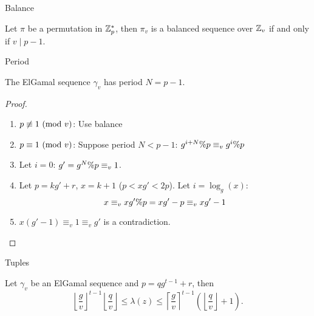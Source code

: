 
\begin{frame}{Balance}

\begin{proposition} \label{balancedproperty}
Let $\pi$ be a permutation in $\mathbb{Z}_p^*$, then $\pi_v$ is a balanced 
sequence over $\mathbb{Z}_v$ if and only if $v \mid p-1$.
\end{proposition}

  
\end{frame}

\begin{frame}{Period}

\begin{theorem}
The ElGamal sequence $\gamma_v$ has period $N = p-1$.
\end{theorem}

\begin{proof}
  \begin{enumerate}
  \item $p \not\equiv 1 \ (\mathrm{mod}\ v)$:  Use balance
  \item $p \equiv 1 \ (\mathrm{mod}\ v)$: Suppose period $N < p-1$: $g^{i+N}\% p \equiv_v g^i \% p$ 
  \item Let $i=0$:  $g' = g^N\% p  \equiv_v 1$.
  \item Let $p = kg'+r$, $x = k+1$ ($p < xg' < 2p$). Let $i = \log_g(x)$:
    \[x \equiv_v xg'\% p = xg'-p \equiv_v xg' -1\]
  \item $x (g'-1) \equiv_v 1 \equiv_v g'$ is a contradiction.
\end{enumerate}
\end{proof}

  
\end{frame}

\begin{frame}{Tuples}

  
\begin{theorem}\label{elgamal_tuple}
  Let $\gamma_v$ be an ElGamal sequence and $p = q g^{t-1} + r$, then
  \[
     \left \lfloor \frac{g}{v} \right \rfloor^{t-1} 
     \left \lfloor\frac{q}{v} \right \rfloor 
\leq \lambda(z) 
\leq \left \lceil \frac{g}{v} \right \rceil^{t-1} 
     \left(\left \lfloor\frac{q}{v} \right\rfloor +1 \right).
  \]
\end{theorem}



  
\end{frame}

